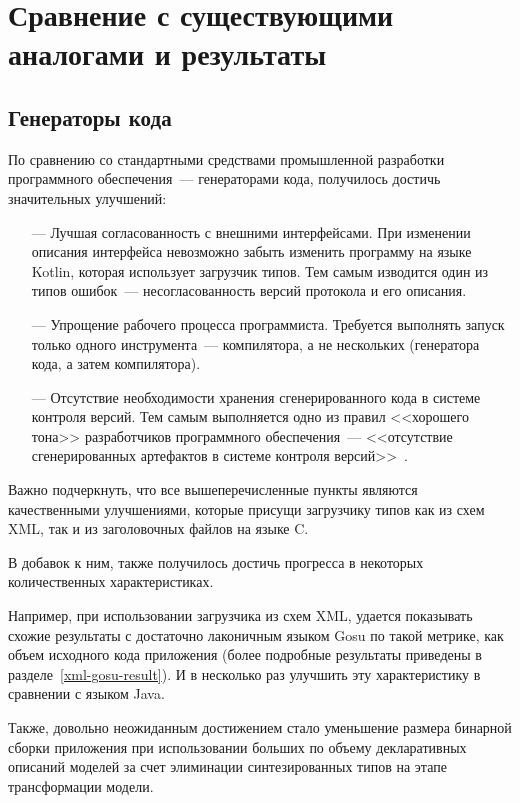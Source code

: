 \section{Сравнение с существующими аналогами и результаты}

\subsection{Генераторы кода}\label{res:generators}
По сравнению со стандартными средствами промышленной разработки программного обеспечения~--- генераторами кода,
получилось достичь значительных улучшений:
\begin{itemize}
	\item[---] Лучшая согласованность с внешними интерфейсами. При изменении описания интерфейса невозможно забыть изменить программу на языке Kotlin, которая использует загрузчик типов. Тем самым изводится один из типов ошибок~--- несогласованность версий протокола и его описания.
	\item[---] Упрощение рабочего процесса программиста. Требуется выполнять запуск только одного инструмента~--- компилятора, а не нескольких (генератора кода, а затем компилятора).
	\item[---] Отсутствие необходимости хранения сгенерированного кода в системе контроля версий. Тем самым выполняется одно из правил <<хорошего тона>> разработчиков программного обеспечения~--- <<отсутствие сгенерированных артефактов в системе контроля версий>>~\cite{art-of-agile}.
\end{itemize}

Важно подчеркнуть, что все вышеперечисленные пункты являются качественными улучшениями, которые присущи загрузчику типов как из схем XML, так и из заголовочных файлов на языке C.

В добавок к ним, также получилось достичь прогресса в некоторых количественных характеристиках.

Например, при использовании загрузчика из схем XML, удается показывать схожие результаты с достаточно лаконичным языком Gosu по такой метрике, как объем исходного кода приложения
(более подробные результаты приведены в разделе~\ref{xml-gosu-result}).
И в несколько раз улучшить эту характеристику в сравнении с языком Java.

Также, довольно неожиданным достижением стало уменьшение размера бинарной сборки приложения при использовании больших по объему декларативных описаний моделей за счет элиминации синтезированных типов на этапе трансформации модели.

